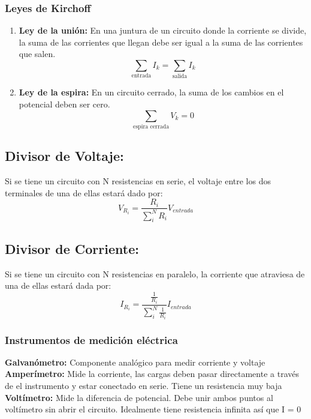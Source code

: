 \documentclass[a4paper, 10pt]{article}
\begin{document}
\begin{multicols*}{2}
	\subsubsection{Leyes de Kirchoff}
	\begin{enumerate}
		\item \textbf{Ley de la unión:} En una juntura de un circuito donde la corriente se divide, la suma de las corrientes que llegan debe ser igual a la suma de las corrientes que salen. 
		      $$\sum_{\text{entrada}} I_k = \sum_{\text{salida}} I_k$$
		\item \textbf{Ley de la espira:} En un circuito cerrado, la suma de los cambios en el potencial deben ser cero.
		      $$\sum_{\text{espira cerrada}} V_k=0$$
		              
	\end{enumerate}

  \subsection{Divisor de Voltaje:}
    Si se tiene un circuito con N resistencias en serie, el voltaje entre los dos terminales
    de una de ellas
    estará dado por:
    \begin{equation}
      V_{R_i} = \frac{R_i}{\sum_i^N R_i}V_{entrada}
    \end{equation}
      
  \subsection{Divisor de Corriente:}
    Si se tiene un circuito con N resistencias en paralelo, la corriente que atraviesa de una de ellas
    estará dada por:
    \begin{equation}
      I_{R_i} = \frac{\frac{1}{R_i}}{\sum_i^N \frac{1}{R_i}}I_{entrada}
    \end{equation}
	\subsubsection{Instrumentos de medición eléctrica}
	\textbf{Galvanómetro:} Componente analógico para medir corriente y voltaje\\
	\textbf{Amperímetro:} Mide la corriente, las cargas deben pasar directamente a través de el instrumento y estar  conectado en serie. Tiene un resistencia muy baja\\
	\textbf{Voltímetro:} Mide la diferencia de potencial. Debe unir ambos puntos al voltímetro sin abrir el circuito. Idealmente tiene resistencia infinita así que I = 0 
	    

\end{multicols*}
\end{document}
